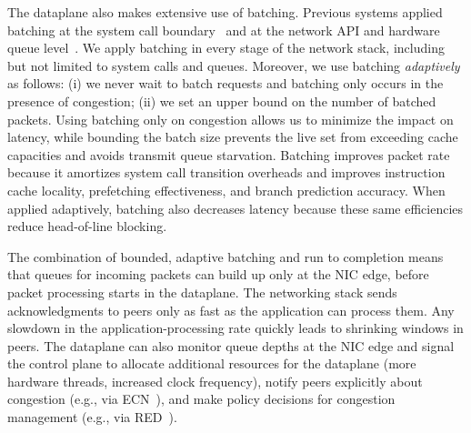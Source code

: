 The \ix dataplane also makes extensive use of batching.  Previous
systems applied batching at the system call
boundary~\cite{DBLP:conf/osdi/HanMCR12, DBLP:conf/osdi/SoaresS10} and
at the network API and hardware queue level~\cite{jeong2014mtcp}.  We
apply batching in every stage of the network stack, including but not
limited to system calls and queues. Moreover, we use batching
\emph{adaptively} as follows: (i) we never wait to batch requests and
batching only occurs in the presence of congestion; (ii) we set an
upper bound on the number of batched packets. Using batching only on
congestion allows us to minimize the impact on latency, while bounding
the batch size prevents the live set from exceeding cache capacities
and avoids transmit queue starvation. Batching improves packet rate
because it amortizes system call transition
overheads %
and improves instruction cache locality, prefetching effectiveness,
and branch prediction accuracy. When applied adaptively, batching also
decreases latency because these same efficiencies reduce head-of-line
blocking.

The combination of bounded, adaptive batching and run to completion
means that queues for incoming packets can build up only at the NIC
edge, before packet processing starts in the dataplane.
The networking stack sends acknowledgments to peers only as fast as
the application can process them. Any slowdown in the
application-processing rate quickly leads to shrinking windows in
peers. The dataplane can also monitor queue depths at the NIC edge and
signal the control plane to allocate additional resources for the
dataplane (more hardware threads, increased clock frequency), notify
peers explicitly about congestion (e.g., via
ECN~\cite{ramakrishnan2001addition}), and make policy decisions for
congestion management (e.g., via
RED~\cite{DBLP:journals/ton/FloydJ93}).

%



